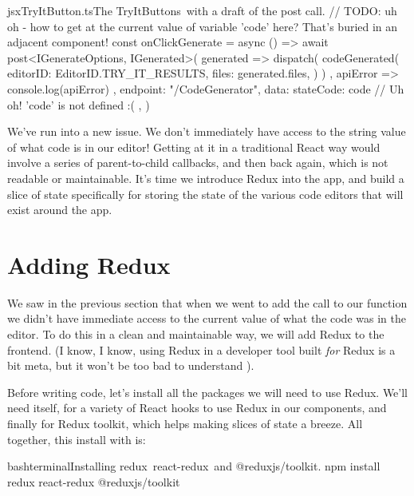 \documentclass[paper=6in:9in,pagesize=pdftex,headinclude=on,footinclude=on,12pt,twoside]{scrbook}
\makeatletter
\newcommand{\at}{\makeatletter @\makeatother}
\makeatother
\begin{document}
\begin{codeInput}{jsx}{TryItButton.ts}{The TryItButtons\, with a draft of the post call.}
// TODO: uh oh - how to get at the current value of variable 'code' here? That's buried in an adjacent component!
const onClickGenerate = async () => {
  await post<IGenerateOptions, IGenerated>(
    generated => {
      dispatch(
        codeGenerated({
          editorID: EditorID.TRY_IT_RESULTS,
          files: generated.files,
        })
      )
    },
    apiError => {
      console.log(apiError)
    },
    {
      endpoint: "/CodeGenerator",
      data: {
        stateCode: code // Uh oh! 'code' is not defined :(
      },
    }
  )
}
\end{codeInput}

We've run into a new issue. We don't immediately have access to the string value of what code is in our editor! Getting at it in a traditional React way would involve a series of parent-to-child callbacks, and then back again, which is not readable or maintainable. It's time we introduce Redux into the app, and build a slice of state specifically for storing the state of the various code editors that will exist around the app.

\section{Adding Redux}

We saw in the previous section that when we went to add the call to our  function we didn't have immediate access to the current value of what the code was in the editor. To do this in a clean and maintainable way, we will add Redux to the frontend. (I know, I know, using Redux in a developer tool built \textit{for} Redux is a bit meta, but it won't be too bad to understand \wink). 


Before writing code, let's install all the packages we will need to use Redux. We'll need  itself,  for a variety of React hooks to use Redux in our components, and finally \codeword{\at reduxjs/toolkit} for Redux toolkit, which helps making slices of state a breeze. All together, this install with  is:

\begin{codeInput}{bash}{terminal}{Installing redux\, react-redux\, and \at reduxjs/toolkit.}
npm install redux react-redux @reduxjs/toolkit
\end{codeInput}
\end{document}
